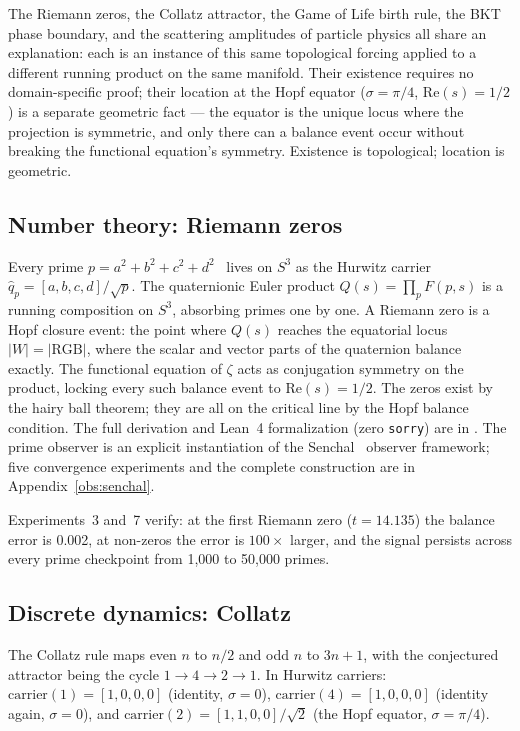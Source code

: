 \documentclass[12pt,a4paper]{article}
\theoremstyle{definition}
\theoremstyle{remark}
\begin{document}
The Riemann zeros, the Collatz attractor, the Game of Life birth rule, the BKT
phase boundary, and the scattering amplitudes of particle physics all share
an explanation: each is an instance of this same topological forcing applied
to a different running product on the same manifold. Their existence requires
no domain-specific proof; their location at the Hopf equator ($\sigma = \pi/4$,
$\mathrm{Re}(s) = 1/2$) is a separate geometric fact --- the equator is the
unique locus where the projection is symmetric, and only there can a balance
event occur without breaking the functional equation's symmetry. Existence is
topological; location is geometric.

\subsection{Number theory: Riemann zeros}

Every prime $p = a^2 + b^2 + c^2 + d^2$~\cite{lagrange1770} lives on $S^3$ as the Hurwitz
carrier $\hat{q}_p = [a,b,c,d]/\sqrt{p}$. The quaternionic Euler product
$Q(s) = \prod_p F(p, s)$ is a running composition on $S^3$, absorbing primes
one by one. A Riemann zero is a Hopf closure event: the point where $Q(s)$
reaches the equatorial locus $|W| = |\mathrm{RGB}|$, where the scalar and
vector parts of the quaternion balance exactly. The functional equation of
$\zeta$ acts as conjugation symmetry on the product, locking every such
balance event to $\mathrm{Re}(s) = 1/2$. The zeros exist by the hairy ball
theorem; they are all on the critical line by the Hopf balance condition. The
full derivation and Lean~4 formalization (zero \texttt{sorry}) are in
\cite{alves2026geometric}. The prime observer is an explicit instantiation of
the Senchal~\cite{senchal2026} observer framework; five convergence experiments
and the complete construction are in Appendix~\ref{obs:senchal}.

Experiments~3 and~7 verify: at the first Riemann zero ($t = 14.135$) the
balance error is 0.002, at non-zeros the error is $100\times$ larger, and the
signal persists across every prime checkpoint from 1,000 to 50,000 primes.

\subsection{Discrete dynamics: Collatz}

The Collatz rule maps even $n$ to $n/2$ and odd $n$ to $3n+1$, with the
conjectured attractor being the cycle $1 \to 4 \to 2 \to 1$. In Hurwitz
carriers: $\mathrm{carrier}(1) = [1,0,0,0]$ (identity, $\sigma = 0$),
$\mathrm{carrier}(4) = [1,0,0,0]$ (identity again, $\sigma = 0$), and
$\mathrm{carrier}(2) = [1,1,0,0]/\sqrt{2}$ (the Hopf equator,
$\sigma = \pi/4$).
\end{document}
